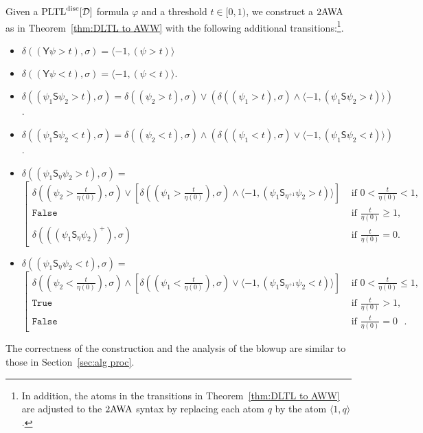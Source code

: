 \documentclass{llncs}
\newcommand{\zug}[1]{\langle #1  \rangle}
\newcommand{\True}{\mathtt{True}}
\newcommand{\False}{\mathtt{False}}
\newcommand{\PLTL}{{\ensuremath{\rm PLTL}}\xspace}
\newcommand{\Yest}{\mathsf{Y}}
\newcommand{\Since}{\mathsf{S}}
\newcommand{\twAWW}{\mbox{\rm 2AWA}\xspace}
\newcommand{\D}{{\cal D}}
\renewcommand{\phi}{\varphi}
\newcommand{\DPLTL}{\ensuremath{\PLTL^{\text{disc}}[\D]}}
\newcommand{\df}{\eta}
\newcommand{\pos}[1]{{#1}^{+}}
\begin{document}
Given a $\DPLTL$ formula $\phi$ and a threshold $t\in [0,1)$, we construct a $\twAWW$ as in
Theorem~\ref{thm:DLTL to AWW} with the following additional transitions:\footnote{In addition, the atoms in the transitions in Theorem~\ref{thm:DLTL to AWW} are adjusted to the $\twAWW$ syntax by replacing each atom $q$ by the atom $\zug{1,q}$.}.
\begin{itemize}
\item $\delta((\Yest \psi > t),\sigma)=\zug{-1,(\psi>t)}$
\item $\delta((\Yest \psi < t),\sigma)=\zug{-1,(\psi<t)}$.
\item $\delta((\psi_1\Since \psi_2 >t),\sigma)=\delta((\psi_2>t),\sigma)\vee (\delta((\psi_1>t),\sigma) \wedge \zug{-1,(\psi_1\Since \psi_2>t)})$.
\item $\delta((\psi_1\Since \psi_2 <t),\sigma)=\delta((\psi_2<t),\sigma)\wedge (\delta((\psi_1<t),\sigma) \vee \zug{-1,(\psi_1\Since \psi_2<t)})$.

\item $\delta((\psi_1\Since_\df \psi_2 >t),\sigma)=$
\\ \spb
$\left[ \begin{array}{ll}
\delta((\psi_2>\frac{t}{\df(0)}),\sigma)\vee 
[\delta((\psi_1>\frac{t}{\df(0)}),\sigma) \wedge \zug{-1,(\psi_1\Since_{\df^{+1}} \psi_2>t)}] &  \mbox{ if $0<\frac{t}{\df(0)}< 1$},\\
\False & \mbox{ if $\frac{t}{\df(0)} \geq 1$},\\
\delta((\pos{(\psi_1\Since_\df \psi_2)}),\sigma) & \mbox{ if $\frac{t}{\df(0)}=0$}.
\end{array}
\right.$

\item $\delta((\psi_1\Since_\df \psi_2 <t),\sigma)=$
\\ \spb
$\left[ \begin{array}{ll}
\delta((\psi_2<\frac{t}{\df(0)}),\sigma)\wedge [\delta((\psi_1<\frac{t}{\df(0)}),\sigma) \vee \zug{-1,(\psi_1\Since_{\df^{+1}} \psi_2<t)}] &  \mbox{ if $0<\frac{t}{\df(0)}\le 1$},\\
\True & \mbox{ if $\frac{t}{\df(0)} > 1$},\\
\False & \mbox{ if $\frac{t}{\df(0)}=0$ }.
\end{array}
\right.$
\end{itemize}



The correctness of the construction and the analysis of the blowup
are similar to those in Section~\ref{sec:alg proc}. 
\end{document}
